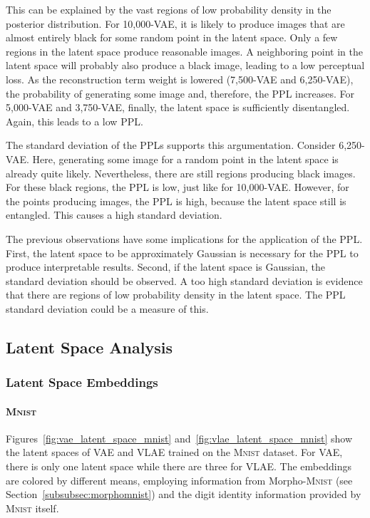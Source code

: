 This can be explained by the vast regions of low probability density in the posterior distribution.
For 10,000-\ac{VAE}, it is likely to produce images that are almost entirely black for some random point in the latent space.
Only a few regions in the latent space produce reasonable images.
A neighboring point in the latent space will probably also produce a black image, leading to a low perceptual loss.
As the reconstruction term weight is lowered (7,500-\ac{VAE} and 6,250-\ac{VAE}), the probability of generating some image and, therefore, the \ac{PPL} increases.
For 5,000-\ac{VAE} and 3,750-\ac{VAE}, finally, the latent space is sufficiently disentangled.
Again, this leads to a low \ac{PPL}.

The standard deviation of the \acp{PPL} supports this argumentation.
Consider 6,250-\ac{VAE}.
Here, generating some image for a random point in the latent space is already quite likely.
Nevertheless, there are still  regions producing black images.
For these black regions, the \ac{PPL} is low, just like for 10,000-\ac{VAE}.
However, for the points producing images, the \ac{PPL} is high, because the latent space still is entangled.
This causes a high standard deviation.

The previous observations have some implications for the application of the \ac{PPL}.
First, the latent space to be approximately Gaussian is necessary for the \ac{PPL} to produce interpretable results.
Second, if the latent space is Gaussian, the standard deviation should be observed.
A too high standard deviation is evidence that there are regions of low probability density in the latent space.
The \ac{PPL} standard deviation could be a measure of this.

\subsection{Latent Space Analysis}\label{subsec:model-generated-samples}

\subsubsection{Latent Space Embeddings}\label{subsubsec:latent_space_embeddings}

\paragraph{\textsc{Mnist}}

Figures~\ref{fig:vae_latent_space_mnist} and~\ref{fig:vlae_latent_space_mnist} show the latent spaces of \ac{VAE} and \ac{VLAE} trained on the \textsc{Mnist} dataset.
For \ac{VAE}, there is only one latent space while there are three for \ac{VLAE}.
The embeddings are colored by different means, employing information from Morpho-\textsc{Mnist} (see Section~\ref{subsubsec:morphomnist}) and the digit identity information provided by \textsc{Mnist} itself.

